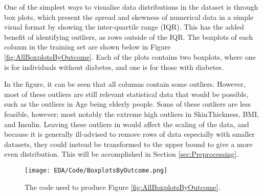 \para One of the simplest ways to visualise data distributions in the dataset is through box plots, which present the spread and skewness of numerical 
data in a simple visual format by showing the inter-quartile range (IQR). This has the added benefit of identifying outliers, as rows outside of the IQR. 
The boxplots of each column in the training set are shown below in Figure \ref{fig:AllBoxplotsByOutcome}. Each of the plots 
contains two boxplots, where one is for individuals without diabetes, and one is for those with diabetes.

\para In the figure, it can be seen that all columns contain some outliers.
However, most of these outliers are still relevant statistical data that would be possible, such as the outliers 
in Age being elderly people. Some of these outliers are less feasible, however; most notably the extreme high outliers 
in SkinThickness, BMI, and Insulin. Leaving these outliers in would affect the scaling of the data, and because it is generally 
ill-advised to remove rows of data especially with smaller datasets, they could instead be transformed to the upper bound to give 
a more even distribution. This will be accomplished in Section \ref{sec:Preprocessing}.

\begin{figure}[H]
    \centering
    \texttt{[image: EDA/Code/BoxplotsByOutcome.png]}
    \caption{The code used to produce Figure \ref{fig:AllBoxplotsByOutcome}.}
    \label{fig:BoxplotsByOutcomeCode}
\end{figure}


